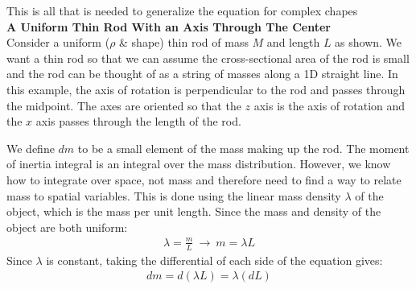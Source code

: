 \documentclass[a4paper]{article}
\let\bf\textbf
\newcommand{\AxisRotator}[1][rotate=0]{%
    \tikz [x=0.25cm,y=0.60cm,line width=.2ex,-stealth,#1] \draw (0,0) arc (-150:150:1 and 1);%
}
\begin{document}
This is all that is needed to generalize the equation for complex chapes
\vspace{2mm}\\
\bf{A Uniform Thin Rod With an Axis Through The Center}
\vspace{2mm}\\
Consider a uniform ($\rho$ \& shape) thin rod of mass $M$ and length $L$ as shown. We want a thin rod so that we can assume the cross-sectional area of the rod is small and the rod can be thought of as a string of masses along a 1D straight line. In this example, the axis of rotation is perpendicular to the rod and passes through the midpoint. The axes are oriented so that the $z$ axis is the axis of rotation and the $x$ axis passes through the length of the rod.
\begin{center}
\end{center}
We define $dm$ to be a small element of the mass making up the rod. The moment of inertia integral is an integral over the mass distribution. However, we know how to integrate over space, not mass and therefore need to find a way to relate mass to spatial variables. This is done using the linear mass density $\lambda$ of the object, which is the mass per unit length. Since the mass and density of the object are both uniform:
\begin{align*}
    \lambda = \frac{m}{L}\ \boldsymbol{\to}\ m = \lambda L
\end{align*}
Since $\lambda$ is constant, taking the differential of each side of the equation gives:
\begin{align*}
    dm = d(\lambda L) = \lambda(dL)
\end{align*}
\end{document}
